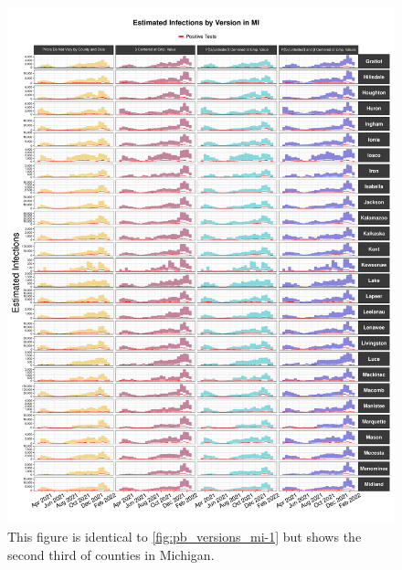 \documentclass[12pt,twoside]{smiththesis}
\begin{document}
\begin{figure}

{\centering \includegraphics[width=1\linewidth]{figure/mi2_pb_compared_to_observed} 

}

\caption{\label{fig:pb_versions_mi-2} This figure is identical to \ref{fig:pb_versions_mi-1} but shows the second third of counties in Michigan.}\label{fig:unnamed-chunk-115}
\end{figure}
\end{document}
